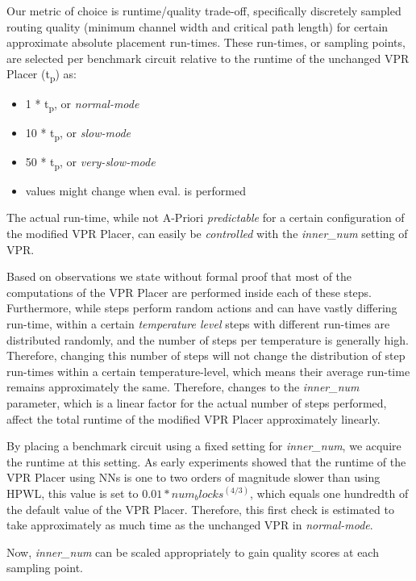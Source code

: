Our metric of choice is runtime/quality trade-off, specifically discretely sampled routing quality (minimum channel width and critical path length) for certain approximate absolute placement run-times. These run-times, or sampling points, are selected per benchmark circuit relative to the runtime of the unchanged \gls{VPR} Placer (t\textsubscript{p}) as:

\begin{itemize}
	\item 1   * t\textsubscript{p}, or \textit{normal-mode}
	\item 10  * t\textsubscript{p}, or \textit{slow-mode}
	\item 50  * t\textsubscript{p}, or \textit{very-slow-mode}
	\item \cite{TODO} values might change when eval. is performed
\end{itemize}

The actual run-time, while not A-Priori \textit{predictable} for a certain configuration of the modified \gls{VPR} Placer, can easily be \textit{controlled} with the \textit{inner\_num} setting of \gls{VPR}.\cite{vtr8} 

Based on observations we state without formal proof that most of the computations of the \gls{VPR} Placer are performed inside each of these steps. Furthermore, while steps perform random actions and can have vastly differing run-time, within a certain \textit{temperature level} steps with different run-times are distributed randomly, and the number of steps per temperature is generally high. Therefore, changing this number of steps will not change the distribution of step run-times within a certain temperature-level, which means their average run-time remains approximately the same. Therefore, changes to the \textit{inner\_num} parameter, which is a linear factor for the actual number of steps performed, affect the total runtime of the modified \gls{VPR} Placer approximately linearly.

By placing a benchmark circuit using a fixed setting for \textit{inner\_num}, we acquire the runtime at this setting. As early experiments showed that the runtime of the \gls{VPR} Placer using \glspl{NN} is one to two orders of magnitude slower than using \gls{HPWL}, this value is set to $0.01*num_blocks^(4/3)$, which equals one hundredth of the default value of the \gls{VPR} Placer. Therefore, this first check is estimated to take approximately as much time as the unchanged \gls{VPR} in \textit{normal-mode}.

Now, \textit{inner\_num} can be scaled appropriately to gain quality scores at each sampling point.

